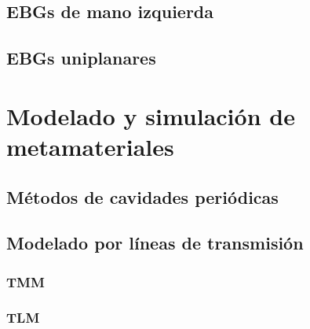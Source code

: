\subsection{EBGs de mano izquierda}
\label{subsec_ebg_izquierda}
\subsection{EBGs uniplanares}
\label{subsec_ebg_uniplanar}
\section{Modelado y simulación de metamateriales}
\label{sec_simulacion_mtm}
\subsection{Métodos de cavidades periódicas}
\label{subsec_eigenfunctions}
\subsection{Modelado por líneas de transmisión}
\subsubsection{TMM}
\subsubsection{TLM}
\label{subsubsec_tlm}
